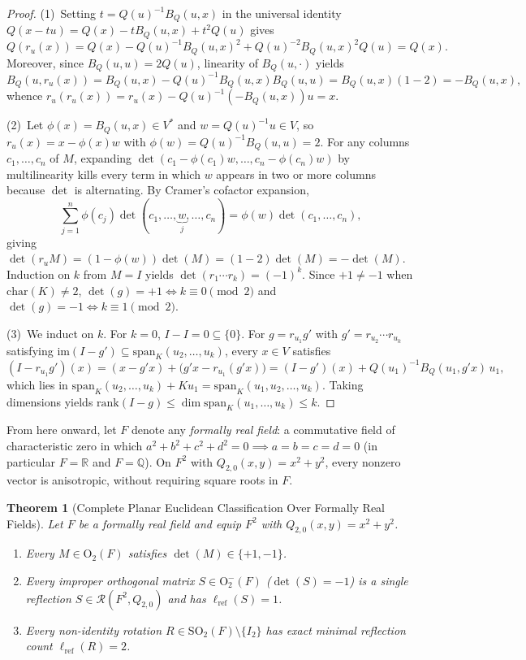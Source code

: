 \documentclass[11pt,a4paper]{article}
\theoremstyle{plain}
\newtheorem{theorem}{Theorem}[section]
\theoremstyle{definition}
\newcommand{\R}{\mathbb{R}}
\newcommand{\Q}{\mathbb{Q}}
\newcommand{\Orth}{\mathrm{O}}
\newcommand{\SO}{\mathrm{SO}}
\newcommand{\Refl}{\mathcal{R}}
\newcommand{\lref}{\ell_{\mathrm{ref}}}
\newcommand{\rk}{\mathrm{rank}}
\newcommand{\im}{\mathrm{im}}
\newcommand{\spn}{\mathrm{span}}
\begin{document}
\begin{proof}
(1)~Setting $t = Q(u)^{-1} B_Q(u, x)$ in the universal identity $Q(x - t u) = Q(x) - t B_Q(u, x) + t^2 Q(u)$ gives
\[
  Q(r_u(x)) = Q(x) - Q(u)^{-1} B_Q(u, x)^2 + Q(u)^{-2} B_Q(u, x)^2 Q(u) = Q(x).
\]
Moreover, since $B_Q(u, u) = 2 Q(u)$, linearity of $B_Q(u, \cdot)$ yields
\[
  B_Q(u, r_u(x)) = B_Q(u, x) - Q(u)^{-1} B_Q(u, x) B_Q(u, u) = B_Q(u, x)(1 - 2) = -B_Q(u, x),
\]
whence $r_u(r_u(x)) = r_u(x) - Q(u)^{-1}(-B_Q(u, x)) u = x$.

(2)~Let $\phi(x) = B_Q(u, x) \in V^*$ and $w = Q(u)^{-1} u \in V$, so $r_u(x) = x - \phi(x) w$ with $\phi(w) = Q(u)^{-1} B_Q(u, u) = 2$. For any columns $c_1, \dots, c_n$ of $M$, expanding $\det(c_1 - \phi(c_1) w, \dots, c_n - \phi(c_n) w)$ by multilinearity kills every term in which $w$ appears in two or more columns because $\det$ is alternating. By Cramer's cofactor expansion,
\[
  \sum_{j=1}^n \phi(c_j) \det(c_1, \dots, \underbrace{w}_{j}, \dots, c_n) = \phi(w) \det(c_1, \dots, c_n),
\]
giving $\det(r_u M) = (1 - \phi(w)) \det(M) = (1 - 2)\det(M) = -\det(M)$. Induction on $k$ from $M = I$ yields $\det(r_1 \cdots r_k) = (-1)^k$. Since $+1 \neq -1$ when $\mathrm{char}(K) \neq 2$, $\det(g) = +1 \iff k \equiv 0 \pmod 2$ and $\det(g) = -1 \iff k \equiv 1 \pmod 2$.

(3)~We induct on $k$. For $k = 0$, $I - I = 0 \subseteq \{0\}$. For $g = r_{u_1} g'$ with $g' = r_{u_2}\cdots r_{u_k}$ satisfying $\im(I - g') \subseteq \spn_K(u_2, \dots, u_k)$, every $x \in V$ satisfies
\[
  (I - r_{u_1} g')(x) = (x - g' x) + \bigl(g' x - r_{u_1}(g' x)\bigr)
  = (I - g')(x) + Q(u_1)^{-1} B_Q(u_1, g' x)\, u_1,
\]
which lies in $\spn_K(u_2, \dots, u_k) + K u_1 = \spn_K(u_1, u_2, \dots, u_k)$. Taking dimensions yields $\rk(I - g) \le \dim \spn_K(u_1, \dots, u_k) \le k$.
\end{proof}

From here onward, let $F$ denote any \emph{formally real field}: a commutative field of characteristic zero in which $a^2 + b^2 + c^2 + d^2 = 0 \implies a = b = c = d = 0$ (in particular $F = \R$ and $F = \Q$). On $F^2$ with $Q_{2,0}(x, y) = x^2 + y^2$, every nonzero vector is anisotropic, without requiring square roots in $F$.

\begin{theorem}[Complete Planar Euclidean Classification Over Formally Real Fields]
\label{thm:planar-class}
Let $F$ be a formally real field and equip $F^2$ with $Q_{2,0}(x, y) = x^2 + y^2$.
\begin{enumerate}
\item Every $M \in \Orth_2(F)$ satisfies $\det(M) \in \{+1, -1\}$.
\item Every improper orthogonal matrix $S \in \Orth_2^-(F)$ ($\det(S) = -1$) is a single reflection $S \in \Refl(F^2, Q_{2,0})$ and has $\lref(S) = 1$.
\item Every non-identity rotation $R \in \SO_2(F) \setminus \{I_2\}$ has exact minimal reflection count $\lref(R) = 2$.
\end{enumerate}
\end{theorem}
\end{document}
